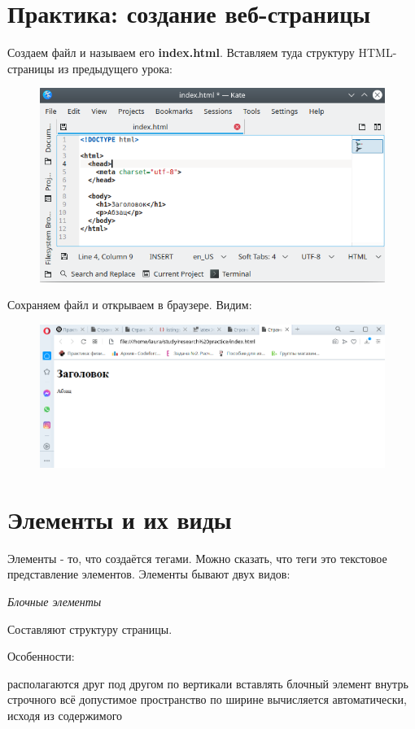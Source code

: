 \documentclass[14pt]{extreport}
\begin{document}
\section{Практика: создание веб-страницы}
Создаем файл и называем его \textbf{index.html}. Вставляем туда структуру HTML-страницы из предыдущего урока:
\begin{figure}[H]
\centerline{\includegraphics[width=0.8\linewidth]{pics_practice/index_html.png}}
\caption{}
\label{3}
\end{figure}
Сохраняем файл и открываем в браузере. Видим:
\begin{figure}[H]
\centerline{\includegraphics[width=0.8\linewidth]{pics_practice/header.png}}
\caption{}
\label{4}
\end{figure}





\section{Элементы и их виды}

Элементы - то, что создаётся тегами. Можно сказать, что теги это текстовое представление элементов. Элементы бывают двух видов:

\emph{Блочные элементы}

Составляют структуру страницы.

Особенности:
\begin{itemize}
 располагаются друг под другом по вертикали
 вставлять блочный элемент внутрь строчного
 всё допустимое пространство по ширине
 вычисляется автоматически, исходя из содержимого
\end{itemize}
\end{document}
